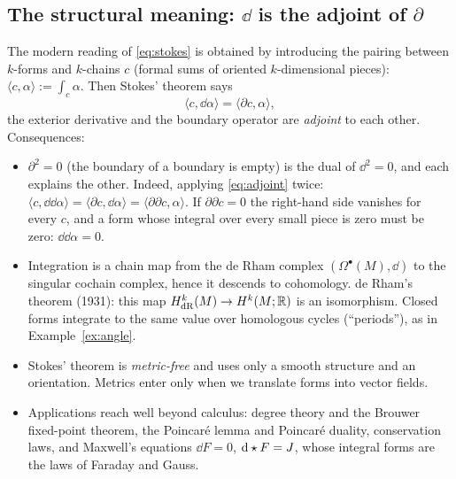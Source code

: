 \subsection{The structural meaning: $\dd$ is the adjoint of $\partial$}\label{sec:adjoint}

The modern reading of \eqref{eq:stokes} is obtained by introducing the pairing between $k$-forms and $k$-chains $c$ (formal sums of oriented $k$-dimensional pieces): $\langle c,\alpha\rangle:=\int_c\alpha$. Then Stokes' theorem says
\begin{equation}\label{eq:adjoint}
\langle c,\dd\alpha\rangle=\langle\partial c,\alpha\rangle,
\end{equation}
\ie the exterior derivative and the boundary operator are \emph{adjoint} to each other. Consequences:
\begin{itemize}
\item $\partial^2=0$ (the boundary of a boundary is empty) is the dual of $\dd^2=0$, and each explains the other. Indeed, applying \eqref{eq:adjoint} twice: $\langle c,\dd\dd\alpha\rangle=\langle\partial c,\dd\alpha\rangle=\langle\partial\partial c,\alpha\rangle$. If $\partial\partial c=0$ the right-hand side vanishes for every $c$, and a form whose integral over every small piece is zero must be zero: $\dd\dd\alpha=0$.
\item Integration is a chain map from the de Rham complex $(\Omega^\bullet(M),\dd)$ to the singular cochain complex, hence it descends to cohomology. de Rham's theorem (1931): this map $H^k_{\mathrm{dR}}(M)\to H^k(M;\mathbb{R})$ is an isomorphism. Closed forms integrate to the same value over homologous cycles (``periods''), as in Example~\ref{ex:angle}.
\item Stokes' theorem is \emph{metric-free} and uses only a smooth structure and an orientation. Metrics enter only when we translate forms into vector fields.
\item Applications reach well beyond calculus: degree theory and the Brouwer fixed-point theorem, the Poincar\'e lemma and Poincar\'e duality, conservation laws, and Maxwell's equations $\dd F=0$, $\mathrm{d}\star F=J$, whose integral forms are the laws of Faraday and Gauss.
\end{itemize}
